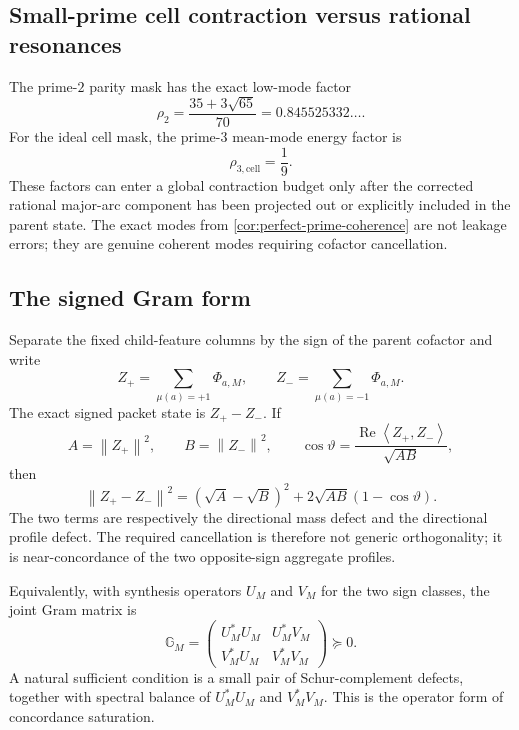 \documentclass[11pt]{article}
\theoremstyle{definition}
\theoremstyle{remark}
\newcommand{\1}{\mathbf{1}}
\newcommand{\ip}[2]{\left\langle #1,#2\right\rangle}
\newcommand{\norm}[1]{\left\lVert #1\right\rVert}
\newcommand{\Repart}{\operatorname{Re}}
\begin{document}
\subsection{Small-prime cell contraction versus rational resonances}

The prime-$2$ parity mask has the exact low-mode factor
\begin{equation}
 \rho_2=\frac{35+3\sqrt{65}}{70}=0.845525332\ldots.
 \label{eq:rho2-fixed}
\end{equation}
For the ideal cell mask, the prime-$3$ mean-mode energy factor is
\begin{equation}
 \rho_{3,\mathrm{cell}}=\frac19.
 \label{eq:rho3-cell-fixed}
\end{equation}
These factors can enter a global contraction budget only after the corrected rational
major-arc component has been projected out or explicitly included in the parent state.
The exact modes from \cref{cor:perfect-prime-coherence} are not leakage errors; they
are genuine coherent modes requiring cofactor cancellation.

\subsection{The signed Gram form}

Separate the fixed child-feature columns by the sign of the parent cofactor and write
\[
 Z_+=\sum_{\mu(a)=+1}\Phi_{a,M},
 \qquad
 Z_-=\sum_{\mu(a)=-1}\Phi_{a,M}.
\]
The exact signed packet state is $Z_+-Z_-$.  If
\[
 A=\norm{Z_+}^2,
 \qquad B=\norm{Z_-}^2,
 \qquad
 \cos\vartheta=\frac{\Repart\ip{Z_+}{Z_-}}{\sqrt{AB}},
\]
then
\begin{equation}
 \norm{Z_+-Z_-}^2
 =\left(\sqrt A-\sqrt B\right)^2
  +2\sqrt{AB}\left(1-\cos\vartheta\right).
 \label{eq:directional-defect-fixed}
\end{equation}
The two terms are respectively the directional mass defect and the directional
profile defect.  The required cancellation is therefore not generic orthogonality;
it is near-concordance of the two opposite-sign aggregate profiles.

Equivalently, with synthesis operators $U_M$ and $V_M$ for the two sign classes, the
joint Gram matrix is
\[
 \mathbb G_M=
 \begin{pmatrix}
  U_M^*U_M&U_M^*V_M\\
  V_M^*U_M&V_M^*V_M
 \end{pmatrix}\succeq0.
\]
A natural sufficient condition is a small pair of Schur-complement defects, together
with spectral balance of $U_M^*U_M$ and $V_M^*V_M$.  This is the operator form of
concordance saturation.
\end{document}
